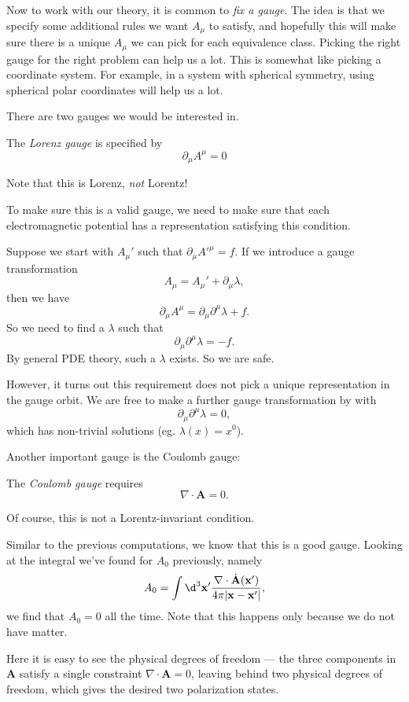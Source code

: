 \documentclass[a4paper]{article}
\begin{document}
Now to work with our theory, it is common to \emph{fix a gauge}. The idea is that we specify some additional rules we want $A_\mu$ to satisfy, and hopefully this will make sure there is a unique $A_\mu$ we can pick for each equivalence class. Picking the right gauge for the right problem can help us a lot. This is somewhat like picking a coordinate system. For example, in a system with spherical symmetry, using spherical polar coordinates will help us a lot.

There are two gauges we would be interested in.
\begin{defi}
  The \emph{Lorenz gauge} is specified by
  \[
    \partial_\mu A^\mu = 0
  \]
\end{defi}
Note that this is Lorenz, \emph{not} Lorentz!

To make sure this is a valid gauge, we need to make sure that each electromagnetic potential has a representation satisfying this condition.

Suppose we start with $A_\mu'$ such that $\partial_\mu A'^\mu = f$. If we introduce a gauge transformation
\[
  A_\mu = A_\mu' + \partial_\mu \lambda,
\]
then we have
\[
  \partial_\mu A^\mu = \partial_\mu \partial^\mu \lambda + f.
\]
So we need to find a $\lambda$ such that
\[
  \partial_\mu \partial^\mu \lambda = -f.
\]
By general PDE theory, such a $\lambda$ exists. So we are safe.

However, it turns out this requirement does not pick a unique representation in the gauge orbit. We are free to make a further gauge transformation by with
\[
  \partial_\mu \partial^\mu \lambda = 0,
\]
which has non-trivial solutions (eg. $\lambda(x) = x^0$).

Another important gauge is the Coulomb gauge:
\begin{defi}
  The \emph{Coulomb gauge} requires
  \[
    \nabla \cdot \mathbf{A} = 0.
  \]
\end{defi}
Of course, this is not a Lorentz-invariant condition.

Similar to the previous computations, we know that this is a good gauge. Looking at the integral we've found for $A_0$ previously, namely
\[
  A_0 = \int \d^3 \mathbf{x}' \frac{\nabla \cdot \dot{\mathbf{A}}(\mathbf{x}')}{4\pi|\mathbf{x} - \mathbf{x}'|},
\]
we find that $A_0 = 0$ all the time. Note that this happens only because we do not have matter.

Here it is easy to see the physical degrees of freedom --- the three components in $\mathbf{A}$ satisfy a single constraint $\nabla \cdot \mathbf{A} = 0$, leaving behind two physical degrees of freedom, which gives the desired two polarization states.
\end{document}
